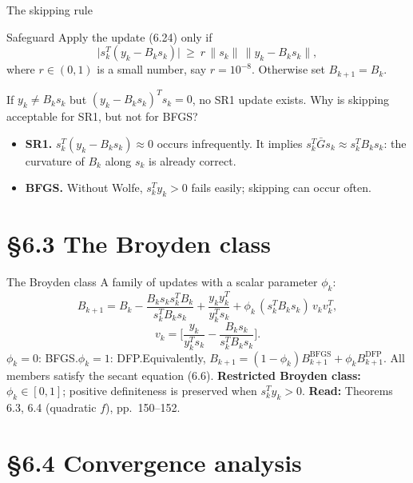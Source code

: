 \documentclass[aspectratio=169,12pt]{beamer}
\newcommand{\Gbar}{\bar{G}}
\newcommand{\readbook}[1]{{\color{red}\textbf{Read:} #1}}
\begin{document}
\begin{frame}{The skipping rule}
  \begin{block}{Safeguard}
    Apply the update (6.24) only if
    \[ \big|s_{k}^{T}(y_{k}-B_{k}s_{k})\big|\ \ge\ r\,\|s_{k}\|\,\|y_{k}-B_{k}s_{k}\| , \tag{6.26} \]
    where $r\in(0,1)$ is a small number, say $r=10^{-8}$. Otherwise set $B_{k+1}=B_{k}$.
  \end{block}

  If $y_{k}\ne B_{k}s_{k}$ but $(y_{k}-B_{k}s_{k})^{T}s_{k}=0$, \alert{no} SR1 update exists.
  Why is skipping acceptable for SR1, but not for BFGS?
  \begin{itemize}\setlength\itemsep{0.35em}
    \item \textbf{SR1.} $s_{k}^{T}(y_{k}-B_{k}s_{k})\approx 0$ occurs infrequently. It implies
      $s_{k}^{T}\Gbar s_{k}\approx s_{k}^{T}B_{k}s_{k}$: the curvature of $B_{k}$ along $s_{k}$ is already correct.
    \item \textbf{BFGS.} Without Wolfe, $s_{k}^{T}y_{k}>0$ fails easily; skipping can occur often.
  \end{itemize}
\end{frame}

\section{\S6.3 The Broyden class}

\begin{frame}{The Broyden class}
  A family of updates with a scalar parameter $\phi_{k}$:
  \[
    B_{k+1}=B_{k}-\frac{B_{k}s_{k}s_{k}^{T}B_{k}}{s_{k}^{T}B_{k}s_{k}}+\frac{y_{k}y_{k}^{T}}{y_{k}^{T}s_{k}}
    +\phi_{k}\,(s_{k}^{T}B_{k}s_{k})\,v_{k}v_{k}^{T},
    \tag{6.32}
  \]
  \[
    v_{k}=\Big[\frac{y_{k}}{y_{k}^{T}s_{k}}-\frac{B_{k}s_{k}}{s_{k}^{T}B_{k}s_{k}}\Big] .
    \tag{6.33}
  \]
  $\phi_{k}=0$: BFGS.\quad $\phi_{k}=1$: DFP.\quad Equivalently,
  $B_{k+1}=(1-\phi_{k})B_{k+1}^{\mathrm{BFGS}}+\phi_{k}B_{k+1}^{\mathrm{DFP}}$.
  All members satisfy the secant equation (6.6).
  \textbf{Restricted Broyden class:} $\phi_{k}\in[0,1]$; positive definiteness is preserved when
  $s_{k}^{T}y_{k}>0$. \readbook{Theorems 6.3, 6.4 (quadratic $f$), pp.~150--152.}
\end{frame}

\section{\S6.4 Convergence analysis}
\end{document}
